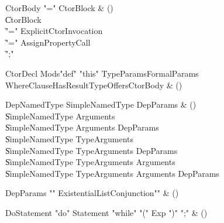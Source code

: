 \begin{bbgrammar}

CtorBody \label{prod:CtorBody}  \: \xcd"=" CtorBlock & () \\

    \| CtorBlock \\
    \| \xcd"=" ExplicitCtorInvocation \\
    \| \xcd"=" AssignPropertyCall \\
    \| \xcd";" \\

\end{bbgrammar}

\begin{bbgrammar}

CtorDecl \label{prod:CtorDecl}  \: Mods\opt \xcd"def" \xcd"this" TypeParams\opt FormalParams WhereClause\opt HasResultType\opt Offers\opt CtorBody & () \\


\end{bbgrammar}

\begin{bbgrammar}

DepNamedType \label{prod:DepNamedType}  \: SimpleNamedType DepParams & () \\

    \| SimpleNamedType Arguments \\
    \| SimpleNamedType Arguments DepParams \\
    \| SimpleNamedType TypeArguments \\
    \| SimpleNamedType TypeArguments DepParams \\
    \| SimpleNamedType TypeArguments Arguments \\
    \| SimpleNamedType TypeArguments Arguments DepParams \\

\end{bbgrammar}

\begin{bbgrammar}

DepParams \label{prod:DepParams}  \: \xcd"{" ExistentialList\opt Conjunction\opt \xcd"}" & () \\


\end{bbgrammar}

\begin{bbgrammar}

DoStatement \label{prod:DoStatement}  \: \xcd"do" Statement \xcd"while" \xcd"(" Exp \xcd")" \xcd";" & () \\


\end{bbgrammar}

